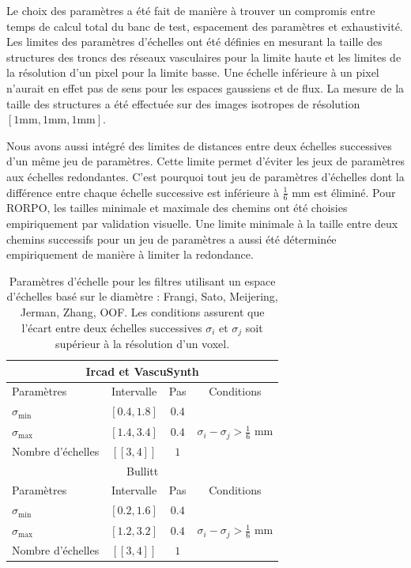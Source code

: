 Le choix des paramètres a été fait de manière à trouver un compromis entre temps de calcul total du banc de test, espacement des paramètres et exhaustivité. Les limites des paramètres d'échelles ont été définies en mesurant la taille des structures des troncs des réseaux vasculaires pour la limite haute et les limites de la résolution d'un pixel pour la limite basse. Une échelle inférieure à un pixel n'aurait en effet pas de sens pour les espaces gaussiens et de flux. La mesure de la taille des structures a été effectuée sur des images isotropes de résolution $[1\textrm{mm},1\textrm{mm},1\textrm{mm}]$. 

Nous avons aussi intégré des limites de distances entre deux échelles successives d'un même jeu de paramètres. Cette limite permet d'éviter les jeux de paramètres aux échelles redondantes. C'est pourquoi tout jeu de paramètres d'échelles dont la différence entre chaque échelle successive est inférieure à $\frac{1}{6}$ mm est éliminé. Pour RORPO, les tailles minimale et maximale des chemins ont été choisies empiriquement par validation visuelle. Une limite minimale à la taille entre deux chemins successifs pour un jeu de paramètres a aussi été déterminée empiriquement de manière à limiter la redondance.
 \begin{table}[!ht]
  \caption{Paramètres d'échelle pour les filtres utilisant un espace d'échelles basé sur le diamètre :  Frangi, Sato, Meijering, Jerman, Zhang, OOF. Les conditions  assurent que l'écart entre deux échelles successives $\sigma_i$ et $\sigma_j$ soit supérieur à la résolution d'un voxel.}
  \label{tab:SS_interval}
  \begin{center}
    \begin{tabular}{  l  c  c  c }
      \hline
      \multicolumn{4}{c}{ Ircad et VascuSynth }\\
      \hline
      Paramètres & Intervalle & Pas & Conditions \\
      \hline
      $\sigma_{\min}$ & $[0.4,1.8]$ & $0.4$ & \\
      $\sigma_{\max}$ & $[1.4,3.4]$  & $0.4$ & $\sigma_{i} - \sigma_{j} > \frac{1}{6}$ mm \\ 
      Nombre d'échelles & $[\![3,4]\!]$ & $1$ & \\
      \hline
      \hline
      \multicolumn{4}{c}{ Bullitt }\\
      \hline
      Paramètres & Intervalle & Pas & Conditions \\
      \hline
      $\sigma_{\min}$ & $[0.2,1.6]$ & $0.4$ & \\
      $\sigma_{\max}$ & $[1.2,3.2]$  & $0.4$ & $\sigma_{i} - \sigma_{j} > \frac{1}{6}$ mm \\ 
      Nombre d'échelles & $[\![3,4]\!]$ & $1$ & \\
      \hline
    \end{tabular}
  \end{center}
\end{table}
